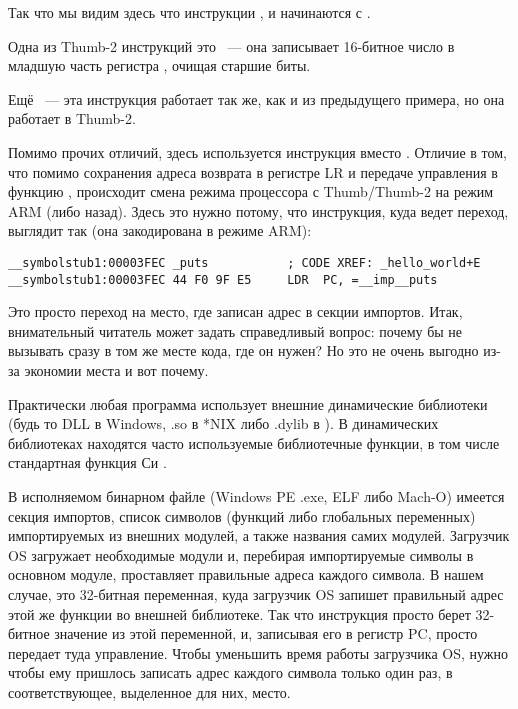 Так что мы видим здесь что инструкции ,  и  начинаются с .

Одна из Thumb-2 инструкций это
~--- она записывает 16-битное число в младшую часть регистра , очищая старшие биты.

Ещё ~--- эта инструкция работает так же, как и  из предыдущего примера, но она работает в Thumb-2.

Помимо прочих отличий, здесь используется инструкция  вместо .
Отличие в том, что помимо сохранения адреса возврата в регистре \ac{LR} и передаче управления 
в функцию \puts, происходит смена режима процессора с Thumb/Thumb-2 на режим ARM (либо назад).
Здесь это нужно потому, что инструкция, куда ведет переход, выглядит так (она закодирована в режиме ARM):

\begin{lstlisting}[style=customasmARM]
__symbolstub1:00003FEC _puts           ; CODE XREF: _hello_world+E
__symbolstub1:00003FEC 44 F0 9F E5     LDR  PC, =__imp__puts
\end{lstlisting}

Это просто переход на место, где записан адрес \puts в секции импортов.
Итак, внимательный читатель может задать справедливый вопрос: почему бы не вызывать \puts сразу в 
том же месте кода, где он нужен?
Но это не очень выгодно из-за экономии места и вот почему.

Практически любая программа использует внешние динамические библиотеки (будь то DLL в Windows, .so в *NIX 
либо .dylib в \MacOSX).
В динамических библиотеках находятся часто используемые библиотечные функции, в том числе стандартная функция Си \puts.

В исполняемом бинарном файле 
(Windows PE .exe, ELF либо Mach-O) имеется секция импортов, список символов (функций либо глобальных переменных) импортируемых из внешних модулей, а также названия самих модулей.
Загрузчик \ac{OS} загружает необходимые модули и, перебирая импортируемые символы в основном модуле, проставляет правильные адреса каждого символа.
В нашем случае,  
это 32-битная переменная, куда загрузчик \ac{OS} запишет правильный адрес этой же функции во внешней библиотеке. 
Так что инструкция  просто берет 32-битное значение из этой переменной, и, записывая его в регистр \ac{PC}, просто передает туда управление.
Чтобы уменьшить время работы загрузчика \ac{OS}, нужно чтобы ему пришлось записать адрес каждого символа только один раз, в соответствующее, выделенное для них, место.

